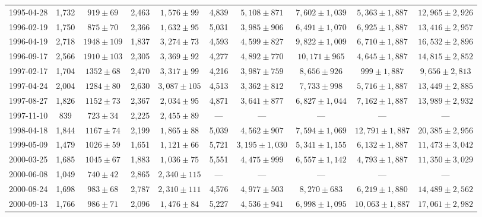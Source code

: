 \begin{landscape}
\begin{longtable}{cccccccccc}
{1995-04-28} & 1,732 & {$919  \pm  69$} & 2,463 & {$1,576 \pm 99$} & 4,839 & {$5,108 \pm 871$} & {$7,602 \pm 1,039$} & {$5,363 \pm 1,887$} & {$12,965 \pm 2,926$} \\
{1996-02-19} & 1,750 & {$875  \pm  70$} & 2,366 & {$1,632 \pm 95$} & 5,031 & {$3,985 \pm 906$} & {$6,491 \pm 1,070$} & {$6,925 \pm 1,887$} & {$13,416 \pm 2,957$} \\
{1996-04-19} & 2,718 & {$1948  \pm  109$} & 1,837 & {$3,274 \pm 73$} & 4,593 & {$4,599 \pm 827$} & {$9,822 \pm 1,009$} & {$6,710 \pm 1,887$} & {$16,532 \pm 2,896$} \\
{1996-09-17} & 2,566 & {$1910  \pm  103$} & 2,305 & {$3,369 \pm 92$} & 4,277 & {$4,892 \pm 770$} & {$10,171 \pm 965$} & {$4,645 \pm 1,887$} & {$14,815 \pm 2,852$} \\
{1997-02-17} & 1,704 & {$1352  \pm  68$} & 2,470 & {$3,317 \pm 99$} & 4,216 & {$3,987 \pm 759$} & {$8,656 \pm 926$} & {$999 \pm 1,887$} & {$9,656 \pm 2,813$} \\
{1997-04-24} & 2,004 & {$1284  \pm  80$} & 2,630 & {$3,087 \pm 105$} & 4,513 & {$3,362 \pm 812$} & {$7,733 \pm 998$} & {$5,716 \pm 1,887$} & {$13,449 \pm 2,885$} \\
{1997-08-27} & 1,826 & {$1152  \pm  73$} & 2,367 & {$2,034 \pm 95$} & 4,871 & {$3,641 \pm 877$} & {$6,827 \pm 1,044$} & {$7,162 \pm 1,887$} & {$13,989 \pm 2,932$} \\
{1997-11-10} & 839 & {$723  \pm  34$} & 2,225 & {$2,455 \pm 89$} & --- & --- & --- & --- & --- \\
{1998-04-18} & 1,844 & {$1167  \pm  74$} & 2,199 & {$1,865 \pm 88$} & 5,039 & {$4,562 \pm 907$} & {$7,594 \pm 1,069$} & {$12,791 \pm 1,887$} & {$20,385 \pm 2,956$} \\
{1999-05-09} & 1,479 & {$1026  \pm  59$} & 1,651 & {$1,121 \pm 66$} & 5,721 & {$3,195 \pm 1,030$} & {$5,341 \pm 1,155$} & {$6,132 \pm 1,887$} & {$11,473 \pm 3,042$} \\
{2000-03-25} & 1,685 & {$1045  \pm  67$} & 1,883 & {$1,036 \pm 75$} & 5,551 & {$4,475 \pm 999$} & {$6,557 \pm 1,142$} & {$4,793 \pm 1,887$} & {$11,350 \pm 3,029$} \\
{2000-06-08} & 1,049 & {$740  \pm  42$} & 2,865 & {$2,340 \pm 115$} & --- & --- & --- & --- & --- \\
{2000-08-24} & 1,698 & {$983  \pm  68$} & 2,787 & {$2,310 \pm 111$} & 4,576 & {$4,977 \pm 503$} & {$8,270 \pm 683$} & {$6,219 \pm 1,880$} & {$14,489 \pm 2,562$} \\
{2000-09-13} & 1,766 & {$986  \pm  71$} & 2,096 & {$1,476 \pm 84$} & 5,227 & {$4,536 \pm 941$} & {$6,998 \pm 1,095$} & {$10,063 \pm 1,887$} & {$17,061 \pm 2,982$} \\

\end{longtable}
\end{landscape}
